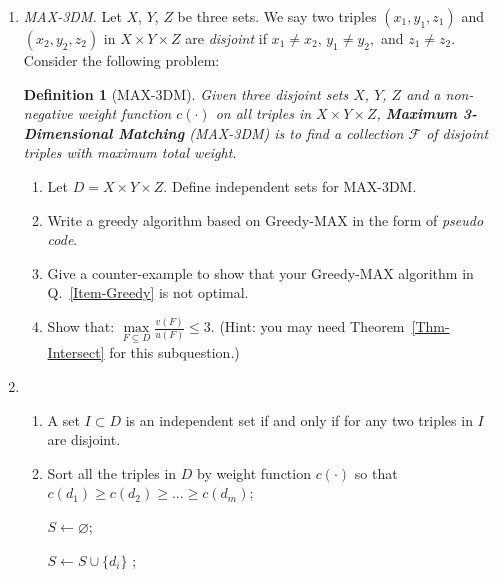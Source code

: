 \documentclass[12pt,a4paper]{article}
\makeatletter
\newtheorem*{solution}{Solution}
\newtheorem{definition}{Definition}
\theoremstyle{definition}
\renewenvironment{solution}[1][Solution] {\par\pushQED{\qed}\normalfont\topsep6\p@\@plus6\p@\relax\trivlist\item[\hskip\labelsep\bfseries#1\@addpunct{.}]\ignorespaces}{\popQED\endtrivlist\@endpefalse} \makeatother
\makeatother
\begin{document}
\begin{enumerate}
\item \textit{MAX-3DM.} Let $X$, $Y$, $Z$ be three sets. We say two triples $\left(x_{1}, y_{1}, z_{1}\right)$ and $\left(x_{2}, y_{2}, z_{2}\right)$ in $X \times Y \times Z$ are \textit{disjoint} if $x_{1} \neq x_{2}$, $y_{1} \neq y_{2},$ and $z_{1} \neq z_{2}$. Consider the following problem:
    
    \begin{definition}[MAX-3DM] 
        Given three disjoint sets $X$, $Y$, $Z$ and a non-negative weight function $c(\cdot)$ on all triples in $X \times Y \times Z$, \textbf{Maximum 3-Dimensional Matching} (MAX-3DM) is to find a collection $\mathcal{F}$ of disjoint triples with maximum total weight.
    \end{definition}

    \begin{enumerate}
    	\item Let $D = X \times Y \times Z$. Define independent sets for MAX-3DM.
    	\item Write a greedy algorithm based on Greedy-MAX in the form of \emph{pseudo code}. \label{Item-Greedy}
    	\item Give a counter-example to show that your Greedy-MAX algorithm in Q.~\ref{Item-Greedy} is not optimal.
    	\item Show that: $\max\limits_{F \subseteq D} \frac{v(F)}{u(F)} \leq 3$. {\color{blue}(Hint: you may need Theorem~\ref{Thm-Intersect} for this subquestion.)} 
    	\end{enumerate}
    	    \begin{solution}
    	        \begin{enumerate}
    	        	\item A set $I\subset D$ is an independent set if and only if for any two triples in $I$ are disjoint.
    	        	\item 
    	        	\begin{minipage}[t]{0.8\textwidth}
        \begin{algorithm}[H]
            \BlankLine
            \caption{Greedy-MAX}
            Sort all the triples in $D$ by weight function $c(\cdot)$ so that $c(d_1) \geqslant c(d_2) \geqslant ... \geqslant c(d_m)$;

            $S \leftarrow \varnothing$;

             {
                 {
                    $S \leftarrow S \cup \{d_i\}$
                }
            }
            ;
        \end{algorithm}
        \end{minipage}
        

\end{enumerate}
\end{solution}
\end{enumerate}
\end{document}
